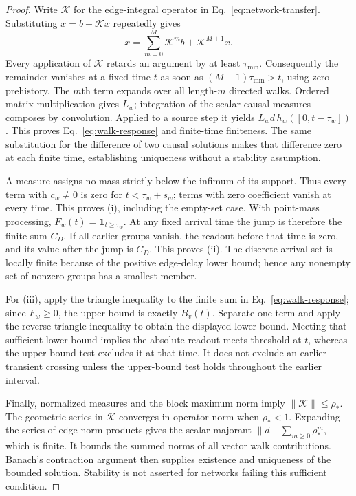 \begin{proof}
Write $\mathcal K$ for the edge-integral operator in Eq.~\eqref{eq:network-transfer}. Substituting $x=b+\mathcal Kx$ repeatedly gives
\[
 x=\sum_{m=0}^{M}\mathcal K^m b+\mathcal K^{M+1}x.
\]
Every application of $\mathcal K$ retards an argument by at least $\tau_{\min}$. Consequently the remainder vanishes at a fixed time $t$ as soon as $(M+1)\tau_{\min}>t$, using zero prehistory. The $m$th term expands over all length-$m$ directed walks. Ordered matrix multiplication gives $L_w$; integration of the scalar causal measures composes by convolution. Applied to a source step it yields $L_wd\,h_w([0,t-\tau_w])$. This proves Eq.~\eqref{eq:walk-response} and finite-time finiteness. The same substitution for the difference of two causal solutions makes that difference zero at each finite time, establishing uniqueness without a stability assumption.

A measure assigns no mass strictly below the infimum of its support. Thus every term with $c_w\ne0$ is zero for $t<\tau_w+s_w$; terms with zero coefficient vanish at every time. This proves (i), including the empty-set case. With point-mass processing, $F_w(t)=\mathbf1_{t\ge\tau_w}$. At any fixed arrival time the jump is therefore the finite sum $C_D$. If all earlier groups vanish, the readout before that time is zero, and its value after the jump is $C_D$. This proves (ii). The discrete arrival set is locally finite because of the positive edge-delay lower bound; hence any nonempty set of nonzero groups has a smallest member.

For (iii), apply the triangle inequality to the finite sum in Eq.~\eqref{eq:walk-response}; since $F_w\ge0$, the upper bound is exactly $B_v(t)$. Separate one term and apply the reverse triangle inequality to obtain the displayed lower bound. Meeting that sufficient lower bound implies the absolute readout meets threshold at $t$, whereas the upper-bound test excludes it at that time. It does not exclude an earlier transient crossing unless the upper-bound test holds throughout the earlier interval.

Finally, normalized measures and the block maximum norm imply $\|\mathcal K\|\le\rho_*$. The geometric series in $\mathcal K$ converges in operator norm when $\rho_*<1$. Expanding the series of edge norm products gives the scalar majorant $\|d\|\sum_{m\ge0}\rho_*^m$, which is finite. It bounds the summed norms of all vector walk contributions. Banach's contraction argument then supplies existence and uniqueness of the bounded solution. Stability is not asserted for networks failing this sufficient condition.
\end{proof}

